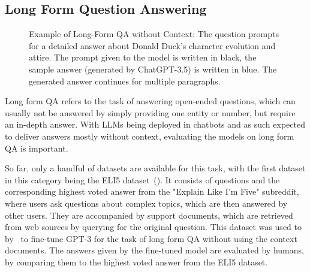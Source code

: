 \subsection{Long Form Question Answering}\label{sec:long-form-qa}
\begin{figure}[tb]
    \centering
    \caption{Example of Long-Form QA without Context: The question prompts for a detailed answer about Donald Duck's character evolution and attire. The prompt given to the model is written in black, the sample answer (generated by ChatGPT-3.5) is written in blue. The generated answer continues for multiple paragraphs.}
    \label{fig:long_form_qa_example_with_answer}
\end{figure}
Long form QA refers to the task of answering open-ended questions, which can usually not be answered by simply providing one entity or number, but require an in-depth answer.
With LLMs being deployed in chatbots and as such expected to deliver answers mostly without context, evaluating the models on long form QA is important.

So far, only a handful of datasets are available for this task, with the first dataset in this category being the ELI5 dataset~(\cite{fan:2019:ELI5}).
It consists of questions and the corresponding highest voted answer from the "Explain Like I'm Five" subreddit, where users ask questions about complex topics, which are then answered by other users.
They are accompanied by support documents, which are retrieved from web sources by querying for the original question.
This dataset was used to by~\cite{nakano:2021:Webgpt} to fine-tune GPT-3 for the task of long form QA without using the context documents.
The answers given by the fine-tuned model are evaluated by humans, by comparing them to the highest voted answer from the ELI5 dataset.

